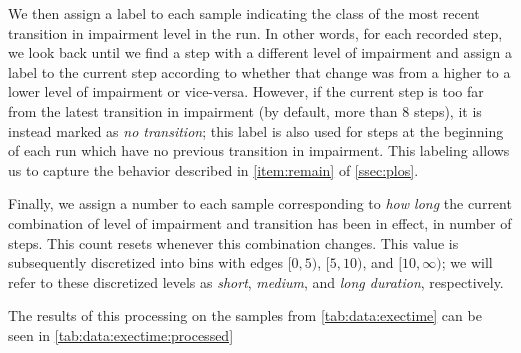 We then assign a label to each sample indicating the class of the most recent transition in impairment level in the run.
In other words, for each recorded step, we look back until we find a step with a different level of impairment and assign a label to the current step according to whether that change was from a higher to a lower level of impairment or vice-versa.
However, if the current step is too far from the latest transition in impairment (by default, more than \num{8} steps), it is instead marked as \emph{no transition}; this label is also used for steps at the beginning of each run which have no previous transition in impairment.
This labeling allows us to capture the behavior described in \cref{item:remain} of \cref{ssec:plos}.

Finally, we assign a number to each sample corresponding to \emph{how long} the current combination of level of impairment and transition has been in effect, in number of steps.
This count resets whenever this combination changes.
This value is subsequently discretized into bins with edges \( [0, 5) \), \( [5, 10) \), and \( [10, \infty) \); we will refer to these discretized levels as \emph{short}, \emph{medium}, and \emph{long duration}, respectively.

The results of this processing on the samples from \cref{tab:data:exectime} can be seen in \cref{tab:data:exectime:processed}

